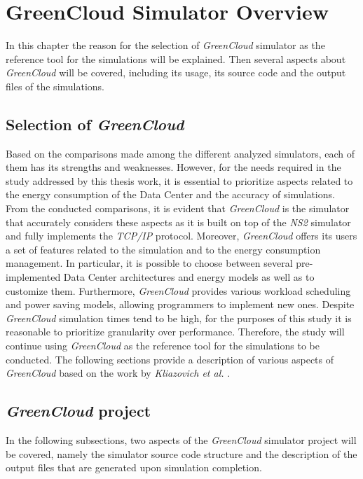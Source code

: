 \chapter{GreenCloud Simulator Overview}

\begin{citazione}
In this chapter the reason for the selection of \emph{GreenCloud} simulator as the reference tool for the simulations will be explained. Then several aspects about \emph{GreenCloud} will be covered, including its usage, its source code and the output files of the simulations.

\end{citazione}
\newpage

\section{Selection of \emph{GreenCloud}} 
Based on the comparisons made among the different analyzed simulators, each of them has its strengths and weaknesses. However, for the needs required in the study addressed by this thesis work, it is essential to prioritize aspects related to the energy consumption of the Data Center and the accuracy of simulations. From the conducted comparisons, it is evident that \emph{GreenCloud} is the simulator that accurately considers these aspects as it is built on top of the \emph{NS2} simulator and fully implements the \emph{TCP/IP} protocol. Moreover, \emph{GreenCloud} offers its users a set of features related to the simulation and to the energy consumption management. In particular, it is possible to choose between several pre-implemented Data Center architectures and energy models as well as to customize them. Furthermore, \emph{GreenCloud} provides various workload scheduling and power saving models, allowing programmers to implement new ones. Despite \emph{GreenCloud} simulation times tend to be high, for the purposes of this study it is reasonable to prioritize granularity over performance. Therefore, the study will continue using \emph{GreenCloud} as the reference tool for the simulations to be conducted. The following sections provide a description of various aspects of \emph{GreenCloud} based on the work by \emph{Kliazovich et al.} \cite{kliazovich2012greencloud}.

\section{\emph{GreenCloud} project}
In the following subsections, two aspects of the \emph{GreenCloud} simulator project will be covered, namely the simulator source code structure and the description of the output files that are generated upon simulation completion.  
